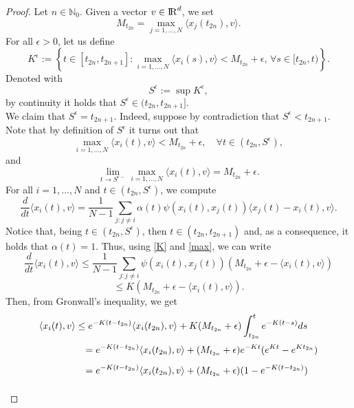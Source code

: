 \documentclass[a4paper,11pt,oneside]{article}
\newcommand{\RR}{{{\rm I} \kern -.15em {\rm R} }}
\begin{document}
	\begin{proof}
		Let $n\in \mathbb{N}_{0}$. Given a vector $v\in \RR^{d}$, we set $$M_{t_{2n}}=\max_{j=1,\dots,N}\langle x_{j}(t_{2n}),v\rangle.$$
	For all $\epsilon >0$, let us define
		$$K^{\epsilon}:=\left\{t\in [t_{2n},t_{2n+1}] :\max_{i=1,\dots,N}\langle x_{i}(s),v\rangle < M_{t_{2n}}+\epsilon,\,\forall s\in [t_{2n},t)\right\}.$$
		Denoted with $$S^{\epsilon}:=\sup K^{\epsilon},$$
		by continuity it holds that $S^{\epsilon}\in (t_{2n},t_{2n+1}]$. \\We claim that $S^{\epsilon}=t_{2n+1}$. Indeed, suppose by contradiction that $S^{\epsilon}<t_{2n+1}$. Note that by definition of $S^{\epsilon}$ it turns out that \begin{equation}\label{max}
			\max_{i=1,\dots,N}\langle x_{i}(t),v\rangle<M_{t_{2n}}+\epsilon,\quad \forall t\in (t_{2n},S^{\epsilon}),
		\end{equation}
		and \begin{equation}\label{teps}
			\lim_{t\to S^{\epsilon-}}\max_{i=1,\dots,N}\langle x_{i}(t),v\rangle=M_{t_{2n}}+\epsilon.
		\end{equation}
		For all $i=1,\dots,N$ and $t\in (t_{2n},S^{\epsilon})$, we compute
		$$\frac{d}{dt}\langle x_{i}(t),v\rangle=\frac{1}{N-1}\sum_{j:j\neq i}\alpha(t)\psi(x_{i}(t), x_{j}(t))\langle x_{j}(t)-x_{i}(t),v\rangle.$$
		Notice that, being $t\in (t_{2n},S^{\epsilon})$, then  $t\in (t_{2n}, t_{2n+1})$ and, as a consequence, it holds that $\alpha(t)=1.$ Thus, using \eqref{K} and \eqref{max}, we can write $$\frac{d}{dt}\langle x_{i}(t),v\rangle\leq \frac{1}{N-1}\sum_{j:j\neq i}\psi(x_{i}(t), x_{j}(t))(M_{t_{2n}}+\epsilon-\langle x_{i}(t),v\rangle)$$$$\leq K(M_{t_{2n}}+\epsilon-\langle x_{i}(t),v\rangle).$$
		Then, from Gronwall's inequality, we get
		$$\begin{array}{l}
			\vspace{0.2cm}\displaystyle{
				\langle x_{i}(t),v\rangle\leq e^{-K(t-t_{2n})}\langle x_{i}(t_{2n}),v\rangle+K(M_{t_{2n}}+\epsilon)\int_{t_{2n}}^{t}e^{-K(t-s)}ds}\\
			\vspace{0.3cm}\displaystyle{\hspace{1.7 cm}
				=e^{-K(t-t_{2n})}\langle x_{i}(t_{2n}),v\rangle+(M_{t_{2n}}+\epsilon)e^{-Kt}(e^{Kt}-e^{Kt_{2n}})}\\
			\vspace{0.3cm}\displaystyle{\hspace{1.7 cm}
				=e^{-K(t-t_{2n})}\langle x_{i}(t_{2n}),v\rangle+(M_{t_{2n}}+\epsilon)(1-e^{-K(t-t_{2n})})}\\

\end{array}$$
\end{proof}
\end{document}
